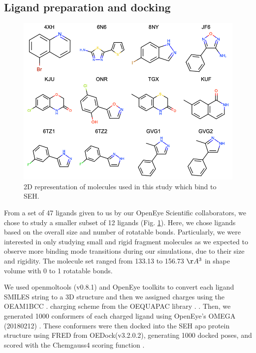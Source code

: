 \subsection{Ligand preparation and docking}
\begin{figure}
    \centering
    \includegraphics[width=\linewidth]{chapter6/Figures/2dmolecules.png}
    \caption[2D Representatin of SEH Fragments]{2D representation of molecules used in this study which bind to SEH.}
    \label{fig:2dmolecules}
\end{figure}
From a set of 47 ligands given to us by our OpenEye Scientific collaborators, we chose to study a smaller subset of 12 ligands (Fig. \ref{fig:2dmolecules}).
Here, we chose ligands based on the overall size and number of rotatable bonds.
Particularly, we were interested in only studying small and rigid fragment molecules as we expected to observe more binding mode transitions during our simulations, due to their size and rigidity.
The molecule set ranged from 133.13 to 156.73 ${\AA^{3}}$ in shape volume with 0 to 1 rotatable bonds.

We used openmoltools (v0.8.1) \cite{openmoltools} and OpenEye toolkits \cite{openeye_toolkit} to convert each ligand SMILES string to a 3D structure and then we assigned charges using the OEAM1BCC \cite{jakalian_fast_2002}. charging scheme from the OEQUAPAC library \cite{jakalian_fast_2002}. .
Then, we generated 1000 conformers of each charged ligand using OpenEye’s OMEGA (20180212) \cite{hawkins_conformer_2010}.
These conformers were then docked into the SEH apo protein structure using FRED from OEDock(v3.2.0.2), generating 1000 docked poses, and scored with the Chemgauss4 scoring function \cite{mcgann_fred_2011}.

